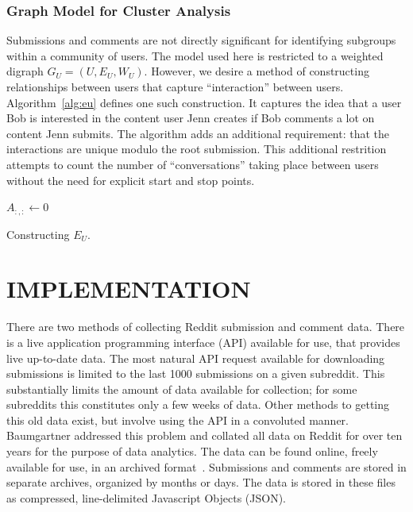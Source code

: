 \documentclass[letterpaper, 10 pt, conference]{ieeeconf}
\theoremstyle{definition}
\begin{document}
\subsubsection{Graph Model for Cluster Analysis}
Submissions and comments are not directly significant for identifying subgroups within a community of users. The model used here is restricted to a weighted digraph \(G_U = (U, E_U, W_U).\) However, we desire a method of constructing relationships between users that capture ``interaction'' between users. Algorithm~\ref{alg:eu} defines one such construction. It captures the idea that a user Bob is interested in the content user Jenn creates if Bob comments a lot on content Jenn submits. The algorithm adds an additional requirement: that the interactions are unique modulo the root submission. This additional restrition attempts to count the number of ``conversations'' taking place between users without the need for explicit start and stop points.
\begin{algorithm}
  \(A_{:,:} \gets 0\)\;
  \caption{Constructing \(E_U.\)}
  \label{alg:eu}
\end{algorithm}

\section{IMPLEMENTATION}
There are two methods of collecting Reddit submission and comment data. There is a live application programming interface (API) available for use, that provides live up-to-date data. The most natural API request available for downloading submissions is limited to the last 1000 submissions on a given subreddit. This substantially limits the amount of data available for collection; for some subreddits this constitutes only a few weeks of data. Other methods to getting this old data exist, but involve using the API in a convoluted manner. Baumgartner addressed this problem and collated all data on Reddit for over ten years for the purpose of data analytics. The data can be found online, freely available for use, in an archived format~\cite{Software:RedditArchive}. Submissions and comments are stored in separate archives, organized by months or days. The data is stored in these files as compressed, line-delimited Javascript Objects (JSON).
\end{document}

